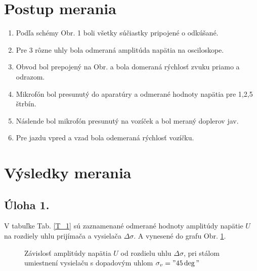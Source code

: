 \documentclass[a4paper,10pt]{article}
\begin{document}
\section{Postup merania}
\begin{enumerate}
\item Podľa schémy Obr. 1 \cite{C_1} boli všetky súčiastky pripojené o odkúšané.
\item Pre 3 rôzne uhly bola odmeraná amplitúda napätia na osciloskope.
\item Obvod bol prepojený na Obr. \cite{C_1} a bola domeraná rýchlosť zvuku priamo a odrazom.
\item Mikrofón bol presunutý do aparatúry a odmerané hodnoty napätia pre  1,2,5 štrbín.
\item Náslende bol mikrofón presunutý na vozíček a bol meraný doplerov jav.
\item Pre jazdu vpred a vzad bola odemeraná rýchlosť vozíčku.
\end{enumerate}

\section{Výsledky merania}
\subsection{Úloha 1.}
V tabuľke Tab. \ref{T_1} sú zaznamenané odmerané hodnoty amplitúdy napätie $U$ na rozdiely uhlu prijímača a vysielača $\Delta \sigma$. A vynesené do grafu Obr. \ref{G_1}.

\begin{figure}

\caption{Závislosť amplitúdy napätia $U$ od rozdielu uhlu $\Delta \sigma$, pri stálom umiestnení vysielaču s dopadovým uhlom $\sigma_v = "45 \deg"$}  \label{G_1}
\end{figure}
\end{document}
